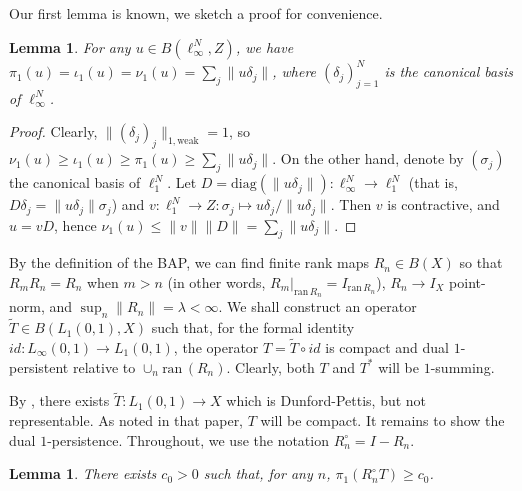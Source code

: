 \documentclass{amsart}
\theoremstyle{plain}
\newtheorem{lemma}[theorem]{Lemma}
\theoremstyle{definition}
\numberwithin{equation}{section}
\newcommand{\ran}{\textrm{ran}\,}
\begin{document}
Our first lemma is known, we sketch a proof for convenience.

\begin{lemma}\label{compute nu1}
For any $u \in B(\ell_\infty^N,Z)$, we have $\pi_1(u) = \iota_1(u) = \nu_1(u) = \sum_j \|u \delta_j\|$, where $(\delta_j)_{j=1}^N$ is the canonical basis of $\ell_\infty^N$.
\end{lemma}

\begin{proof}
Clearly, $\|(\delta_j)_j\|_{1,{\textrm{weak}}} = 1$, so $\nu_1(u) \geq \iota_1(u) \geq \pi_1(u) \geq \sum_j \|u \delta_j\|$.
On the other hand, denote by $(\sigma_j)$ the canonical basis of $\ell_1^N$. 
Let $D = {\textrm{diag}}(\|u \delta_j\|) : \ell_\infty^N \to \ell_1^N$ (that is, $D \delta_j = \|u \delta_j\| \sigma_j$) and $v : \ell_1^N \to Z : \sigma_j \mapsto u \delta_j/\|u \delta_j\|$.
Then $v$ is contractive, and $u = vD$, hence $\nu_1(u) \leq \|v\| \|D\| = \sum_j \|u \delta_j\|$.
\end{proof}

By the definition of the BAP, we can find finite rank maps $R_n \in B(X)$ so that $R_m R_n = R_n$ when $m >n$ (in other words, $R_m\big|_{\ran R_n} = I_{\ran R_n}$), $R_n \to I_X$ point-norm, and $\sup_n \|R_n\| = \lambda < \infty$.
We shall construct an operator $\widetilde{T} \in B(L_1(0,1),X)$ such that, for the formal identity $id : L_\infty(0,1) \to L_1(0,1)$, the operator $T = \widetilde{T} \circ id$ is compact and dual $1$-persistent relative to $\cup_n \ran(R_n)$. Clearly, both $T$ and $T^*$ will be $1$-summing.

By \cite{bourgain-DP}, there exists $\widetilde{T} : L_1(0,1) \to X$ which is Dunford-Pettis, but not representable. As noted in that paper, $T$ will be compact. It remains to show the dual $1$-persistence.
Throughout, we use the notation $R_n^\circ = I - R_n$.

\begin{lemma}\label{1-summing}
There exists $c_0 > 0$ such that, for any $n$, $\pi_1(R_n^\circ T) \geq c_0$.
\end{lemma}
\end{document}
